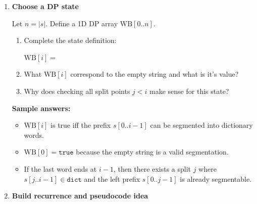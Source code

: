 \documentclass[11pt]{article}
\begin{document}
\begin{enumerate}[leftmargin=0pt, itemindent=1.7em, itemsep=1.2em]
\vspace{1.0cm}

\ifanswers
\textbf{Sample filled row:}
\[
\begin{array}{c|cccccccccccccc}
i & 0 & 1 & 2 & 3 & 4 & 5 & 6 & 7 & 8 & 9 & 10 & 11 & 12 & 13 \\\hline
\mathrm{WB}[i] & T & F & F & F & F & T & F & F & T & F & F & F & F & T
\end{array}
\]
$\mathrm{WB}[13]=\texttt{true}$ via \texttt{apple + pen + apple}.
\fi

\item \textbf{Choose a DP state}

Let $n=|s|$. Define a 1D DP array $\mathrm{WB}[0..n]$.

\begin{enumerate}[label=(\alph*), leftmargin=2em, itemsep=0.9em]
\item Complete the state definition:

\vspace{0.2cm}
\hspace*{1em}$\mathrm{WB}[i] =$ \hrulefill

\vspace{0.7cm}
\item What $\mathrm{WB}[i]$ correspond to the empty string and what is it's value?

\vspace{0.9cm}
\item Why does checking all split points $j < i$ make sense for this state?

\vspace{1.1cm}
\end{enumerate}

\ifanswers
\textbf{Sample answers:}
\begin{itemize}
    \item $\mathrm{WB}[i]$ is true iff the prefix $s[0..i-1]$ can be segmented into dictionary words.
    \item $\mathrm{WB}[0]=\texttt{true}$ because the empty string is a valid segmentation.
    \item If the last word ends at $i-1$, then there exists a split $j$ where $s[j..i-1]\in\texttt{dict}$ and the left prefix $s[0..j-1]$ is already segmentable.
\end{itemize}
\fi

\newpage

\item \textbf{Build recurrence and pseudocode idea}


\end{enumerate}
\end{document}
